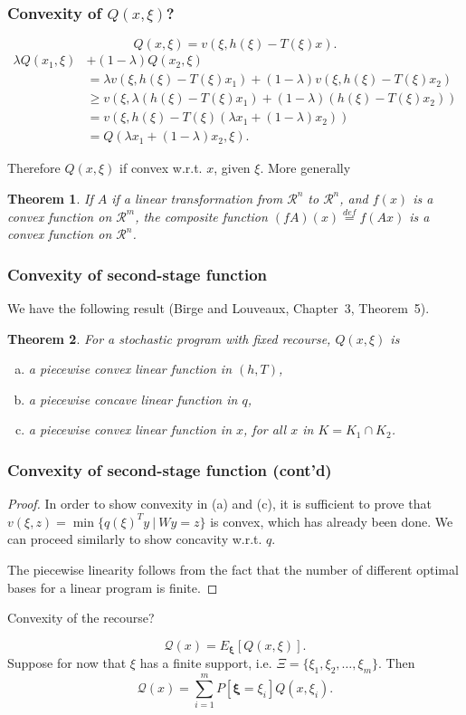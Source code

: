 \documentclass{beamer}
\newtheorem{theo}{Theorem}
\def\bxi{\boldsymbol\xi}
\def\bxi{\boldsymbol\xi}
\def\rit{\mathcal{R}}
\begin{document}
\begin{frame}
\frametitle{Convexity of $Q(x, \xi)$?}

\[
Q(x,\xi) = v(\xi, h(\xi)-T(\xi)x).
\]
\begin{align*}
\lambda Q(x_1, \xi) &+ (1-\lambda) Q(x_2, \xi) \\
&= \lambda v(\xi, h(\xi)-T(\xi)x_1) + (1-\lambda) v(\xi, h(\xi)-T(\xi)x_2) \\
&\geq v(\xi, \lambda (h(\xi)-T(\xi)x_1) + (1-\lambda)(h(\xi)-T(\xi)x_2)) \\
&= v(\xi, h(\xi)-T(\xi)(\lambda x_1 + (1-\lambda)x_2)) \\
&= Q(\lambda x_1 + (1-\lambda)x_2, \xi).
\end{align*}

Therefore {\red $Q(x, \xi)$ if convex} w.r.t. $x$, given $\xi$.
More generally
\begin{theo}
If $A$ if a linear transformation from $\rit^n$ to $\rit^n$, and $f(x)$ is a convex function on $\rit^m$, the composite function $(fA)(x) \overset{def}{=} f(Ax)$ is a convex function on $\rit^n$.
\end{theo}
\end{frame}

\begin{frame}
\frametitle{Convexity of second-stage function}

We have the following result (Birge and Louveaux, Chapter~3, Theorem~5).
\begin{theo}
For a stochastic program with fixed recourse, $Q(x,\xi)$ is
\begin{enumerate}[(a)]
\item
a piecewise convex linear function in $(h,T)$,
\item
a piecewise concave linear function in $q$,
\item
a piecewise convex linear function in $x$, for all $x$ in $K = K_1 \cap K_2$.
\end{enumerate}
\end{theo}

\end{frame}

\begin{frame}
\frametitle{Convexity of second-stage function (cont'd)}

\begin{proof}
In order to show convexity in (a) and (c), it is sufficient to prove that $v(\xi, z) = \min \lbrace q(\xi)^Ty \ |\ Wy = z \rbrace$ is convex, which has already been done.
We can proceed similarly to show concavity w.r.t. $q$.

The piecewise linearity follows from the fact that the number of different optimal bases for a linear program is finite.
\end{proof}

\mbox{}

{\red Convexity of the recourse?}

\[
\mathcal{Q}(x) = E_{\bxi} [Q(x,\xi)].
\]
Suppose for now that $\xi$ has a finite support, i.e. $\Xi = \lbrace \xi_1 ,
\xi_2,\ldots, \xi_m \rbrace$. Then
\[
\mathcal{Q}(x) = \sum_{i = 1}^{m} P[\bxi = \xi_i] Q(x,\xi_i).
\]
\end{frame}
\end{document}
